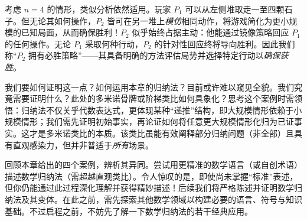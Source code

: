 \begin{center}
\end{center}

考虑 $n = 4$ 的情形，类似分析依然适用。玩家 $P_1$ 可以从左侧堆取走一至四颗石子。但无论其如何操作，$P_2$ 皆可在另一堆上\emph{模仿}相同动作，将游戏简化为更小规模的已知局面，从而确保胜利！$P_2$ 似乎始终占据主动：他能通过镜像策略回应 $P_1$ 的任何操作。无论 $P_1$ 采取何种行动，$P_2$ 的针对性回应终将导向胜利。因此我们称``$P_2$ 拥有必胜策略''——其具备明确的方法评估局势并选择特定行动以\emph{确保获胜}。

我们要如何证明这一点？如何运用本章的归纳法？目前或许难以窥见全貌。我们究竟需要证明什么？此处的多米诺骨牌或阶梯类比如何具象化？思考这个案例时需领悟：归纳法不仅关乎代数表达式，更体现某种``递推''结构，即大规模情形依赖于小规模情形；我们需先证明初始事实，再论证如何将任意更大规模情形化归为已证事实。这才是多米诺类比的本质。该类比虽能有效阐释部分归纳问题（非全部）且具有直观感染力，但并非普适于\emph{所有}场景。

回顾本章给出的四个案例，辨析其异同。尝试用更精准的数学语言（或自创术语）描述数学归纳法（需超越直观类比）。令人惊叹的是，即使尚未掌握``标准''表述，但你仍能通过此过程深化理解并获得精妙描述！后续我们将严格陈述并证明数学归纳法及其变体。在此之前，需先探索其他数学领域以构建必要的语言、符号与知识基础。不过启程之前，不妨先了解一下数学归纳法的若干经典应用。
